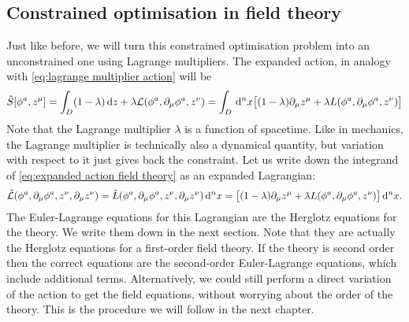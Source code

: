 \documentclass[../main.tex]{subfiles}
\begin{document}
\subsection{Constrained optimisation in field theory}
Just like before, we will turn this constrained optimisation problem into an
unconstrained one using Lagrange multipliers. The expanded action, in analogy with
\cref{eq:lagrange multiplier action} will be
\begin{equation}\label{eq:expanded action field theory}
	\tilde{S}[\phi^a, z^\mu] = \int_D (1 - \lambda) \,\mathrm{d} z + \lambda \mathcal{L}(\phi^a, \partial_\mu
	\phi^a, z^\nu) = \int_D \,\mathrm{d}^n x \big[ (1 - \lambda) \partial_\mu z^\mu + \lambda L(\phi^a,
	\partial_\mu \phi^a, z^\nu) \big]
\end{equation}
Note that the Lagrange multiplier \( \lambda \) is a function of spacetime. Like in
mechanics, the Lagrange multiplier is technically also a dynamical quantity, but variation
with respect to it just gives back the constraint. Let us write down the integrand of
\cref{eq:expanded action field theory} as an expanded Lagrangian:
\begin{equation} \label{eq:expanded lagrangian field theory}
	\tilde{\mathcal{L}}(\phi^a, \partial_\mu \phi^a, z^\nu, \partial_\mu z^\nu) = \tilde{L}(\phi^a,
	\partial_\mu \phi^a, z^\nu, \partial_\mu z^\nu)\,\mathrm{d}^n x = \big[ (1 - \lambda)
	\partial_\mu z^\mu + \lambda L(\phi^a, \partial_\mu \phi^a, z^\nu) \big] \,\mathrm{d}^n x.
\end{equation}
The Euler-Lagrange equations for this Lagrangian are the Herglotz equations for the
theory. We write them down in the next section. Note that they are actually the Herglotz
equations for a first-order field theory. If the theory is second order then the correct
equations are the second-order Euler-Lagrange equations, which include additional terms.
Alternatively, we could still perform a direct variation of the action to get the field
equations, without worrying about the order of the theory. This is the procedure we will
follow in the next chapter. 
\end{document}
